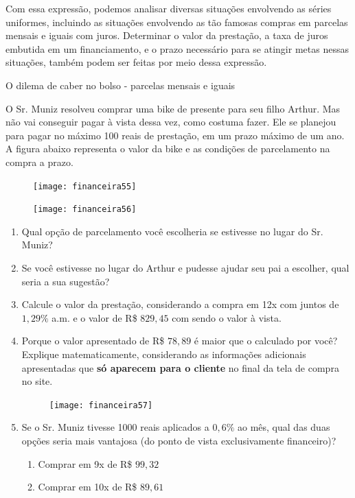 Com essa expressão, podemos analisar diversas situações envolvendo as séries uniformes, incluindo as situações envolvendo as tão famosas compras em parcelas mensais e iguais com juros. Determinar o valor da prestação, a taxa de juros embutida em um financiamento, e o prazo necessário para se atingir metas nessas situações, também podem ser feitas por meio dessa expressão.



\begin{task}{O dilema de caber no bolso - parcelas mensais e iguais}
\label{fin-ativ-22}

O Sr. Muniz resolveu comprar uma bike de presente para seu filho Arthur. Mas não vai conseguir pagar à vista dessa vez, como costuma fazer. Ele se planejou para pagar no máximo 100 reais de prestação, em um prazo máximo de um ano. A figura abaixo representa o valor da bike e as condições de parcelamento na compra a prazo.


\begin{figure}[H]
\centering

\texttt{[image: financeira55]}
\end{figure}

\begin{figure}[H]
\centering

\texttt{[image: financeira56]}
\end{figure}

\begin{enumerate}
\item Qual opção de parcelamento você escolheria se estivesse no lugar do Sr. Muniz?
\item Se você estivesse no lugar do Arthur e pudesse ajudar seu pai a escolher, qual seria a sua sugestão?
\item Calcule o valor da prestação, considerando a compra em 12x com juntos de $1{,}29\%$ a.m. e o valor de R\$ $829{,}45$ com sendo o valor à vista. 
\item Porque o valor apresentado de R\$ $78{,}89$ é maior que o calculado por você? Explique matematicamente, considerando as informações adicionais apresentadas que \textbf{só aparecem para o cliente} no final da tela de compra no site.

\begin{figure}[H]
\centering

\texttt{[image: financeira57]}
\end{figure}

\item Se o Sr. Muniz tivesse 1000 reais aplicados a $0{,}6\%$ ao mês, qual das duas opções seria mais vantajosa (do ponto de vista exclusivamente financeiro)?

\begin{enumerate}[label=\Roman* -]
\item Comprar em 9x de R\$ $99{,}32$
\item Comprar em 10x de R\$ $89{,}61$
\end{enumerate}
\end{enumerate}
\end{task}

